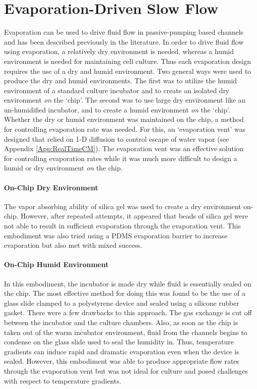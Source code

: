 \section{Evaporation-Driven Slow Flow}
Evaporation can be used to drive fluid flow in passive-pumping based channels and has been described previously in the literature\cite{Frisk:2008pi,Walker:2002oy,Berthier:2008tl,Berthier:2008jf}. In order to drive fluid flow using evaporation, a relatively dry environment is needed, whereas a humid environment is needed for maintaining cell culture. Thus each evaporation design requires the use of a dry and humid environment. Two general ways were used to produce the dry and humid environments. The first was to utilize the humid environment of a standard culture incubator and to create an isolated dry environment \emph{on} the `chip'. The second was to use large dry environment like an un-humidified incubator, and to create a humid environment \emph{on} the `chip'. Whether the dry or humid environment was maintained on the chip, a method for controlling evaporation rate was needed. For this, an `evaporation vent' was designed that relied on 1-D diffusion to control escape of water vapor (see Appendix \ref{App:RealTimeCM}). The evaporation vent was an effective solution for controlling evaporation rates while it was much more difficult to design a humid or dry environment \emph{on} the chip.

\paragraph{On-Chip Dry Environment}
The vapor absorbing ability of silica gel was used to create a dry environment on-chip. However, after repeated attempts, it appeared that beads of silica gel were not able to result in sufficient evaporation through the evaporation vent. This embodiment was also tried using a PDMS evaporation barrier to increase evaporation but also met with mixed success.

\paragraph{On-Chip Humid Environment}
In this embodiment, the incubator is made dry while fluid is essentially sealed on the chip. The most effective method for doing this was found to be the use of a glass slide clamped to a polystyrene device and sealed using a silicone rubber gasket. There were a few drawbacks to this approach. The gas exchange is cut off between the incubator and the culture chambers. Also, as soon as the chip is taken out of the warm incubator environment, fluid from the channels begins to condense on the glass slide used to seal the humidity in. Thus, temperature gradients can induce rapid and dramatic evaporation even when the device is sealed. However, this embodiment was able to produce appropriate flow rates through the evaporation vent but was not ideal for culture and posed challenges with respect to temperature gradients.

